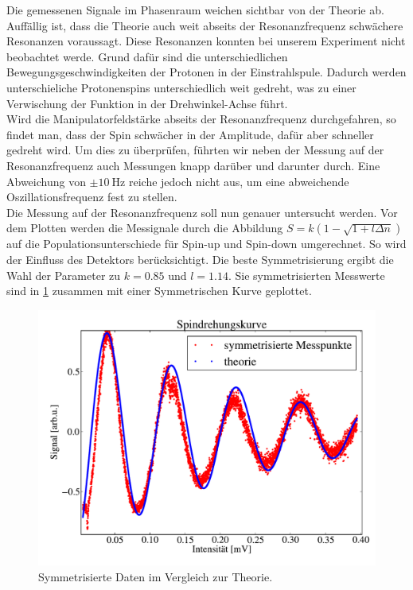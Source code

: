 \documentclass[paper=a4,
	fontsize=10pt,
	DIV=18,
	twocolumn,
	parskip=half
	]{scrartcl}
\numberwithin{equation}{section}    %
\begin{document}
Die gemessenen Signale im Phasenraum weichen sichtbar von der Theorie ab.
Auffällig ist, dass die Theorie auch weit abseits der Resonanzfrequenz schwächere Resonanzen voraussagt.
Diese Resonanzen konnten bei unserem Experiment nicht beobachtet werde.
Grund dafür sind die unterschiedlichen Bewegungsgeschwindigkeiten der Protonen in der Einstrahlspule.
Dadurch werden unterschieliche Protonenspins unterschiedlich weit gedreht, was zu einer Verwischung der Funktion in der Drehwinkel-Achse führt.\\
Wird die Manipulatorfeldstärke abseits der Resonanzfrequenz durchgefahren, so findet man, dass der Spin schwächer in der Amplitude, dafür aber schneller gedreht wird.
Um dies zu überprüfen, führten wir neben der Messung auf der Resonanzfrequenz auch Messungen knapp darüber und darunter durch. 
Eine Abweichung von $\pm \SI{10}{\hertz}$ reiche jedoch nicht aus, um eine abweichende Oszillationsfrequenz  fest zu stellen.\\
Die Messung auf der Resonanzfrequenz soll nun genauer untersucht werden. 
Vor dem Plotten werden die Messignale durch die Abbildung $S=k(1-\sqrt{1+l \Delta n})$ auf die Populationsunterschiede für Spin-up und Spin-down umgerechnet.
So wird der Einfluss des Detektors berücksichtigt.
Die beste Symmetrisierung ergibt die Wahl der Parameter zu $k=0.85$ und $l=1.14$. 
Sie symmetrisierten Messwerte sind in \cref{symmetr} zusammen mit einer Symmetrischen Kurve geplottet.

\begin{figure}[htp]
	\begin{center}
		\includegraphics[width=\columnwidth]{Data-Plots/11-Spindrehkurve.pdf}
		\caption{Symmetrisierte Daten im Vergleich zur Theorie.}
		\label{symmetr}
	\end{center}
\end{figure}
\end{document}
